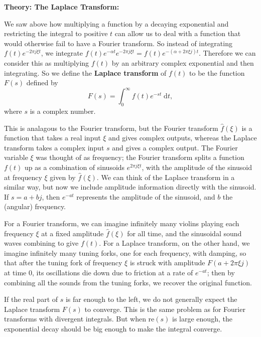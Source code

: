 \documentclass{article}
\newcommand{\diff}{\;\mathrm{d}}
\begin{document}
\clearpage






\textbf{Theory: The Laplace Transform:}

\bigskip


We saw above how multiplying a function by a decaying exponential and restricting the integral to positive $t$ can allow us to deal with a function that would otherwise fail to have a Fourier transform. So instead of integrating $f(t)e^{-2\pi j\xi t}$, we integrate $f(t)e^{-\alpha t}e^{-2\pi j\xi t}=f(t)e^{-(\alpha+2\pi \xi j)t}$. Therefore we can consider this as multiplying $f(t)$ by an arbitrary complex exponential and then integrating. So we define the \textbf{Laplace transform} of $f(t)$ to be the function $F(s)$ defined by
\[F(s)=\int_0^\infty f(t)e^{-st}\diff t,\]
where $s$ is a complex number.

This is analagous to the Fourier transform, but the Fourier transform $\hat{f}(\xi)$ is a function that takes a real input $\xi$ and gives complex outputs, whereas the Laplace transform takes a complex input $s$ and gives a complex output. The Fourier variable $\xi$ was thought of as frequency; the Fourier transform splits a function $f(t)$ up as a combination of sinusoids $e^{2\pi j \xi t}$, with the amplitude of the sinusoid at frequency $\xi$ given by $\hat{f}(\xi)$. We can think of the Laplace transform in a similar way, but now we include amplitude information directly with the sinusoid. If $s=a+bj$, then $e^{-at}$ represents the amplitude of the sinusoid, and $b$ the (angular) frequency.

For a Fourier transform, we can imagine infinitely many violins playing each frequency $\xi$ at a fixed amplitude $\hat{f}(\xi)$ for all time, and the sinusoidal sound waves combining to give $f(t)$. For a Laplace transform, on the other hand, we imagine infinitely many tuning forks, one for each frequency, with damping, so that after the tuning fork of frequency $\xi$ is struck with amplitude $F(a+2\pi \xi j)$ at time 0, its oscillations die down due to friction at a rate of $e^{-at}$; then by combining all the sounds from the tuning forks, we recover the original function.

If the real part of $s$ is far enough to the left, we do not generally expect the Laplace transform $F(s)$ to converge. This is the same problem as for Fourier transforms with divergent integrals. But when $\mathrm{re}(s)$ is large enough, the exponential decay should be big enough to make the integral converge.
\end{document}
